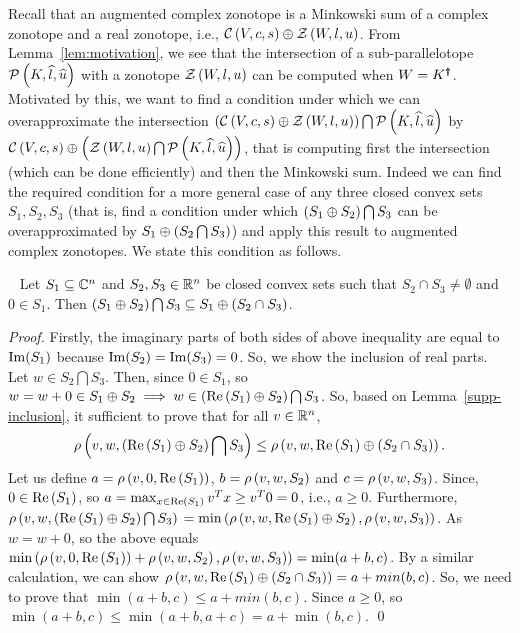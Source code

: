 Recall that an augmented complex zonotope is a Minkowski sum of a
complex zonotope and a real zonotope, i.e.,
$\cz{V}{c}{s}\oplus\zon{W}{l}{u}$.  From Lemma~\ref{lem:motivation},
we see that the intersection of a sub-parallelotope
$\sptope{K}{\wh{l}}{\wh{u}}$ with a zonotope $\zon{W}{l}{u}$ can be
computed when $W=\pinv{K}$.  Motivated by this, we want to
find a condition under which we can overapproximate the intersection
$\lt(\cz{V}{c}{s}\oplus\zon{W}{l}{u}\rt)\bigcap\sptope{K}{\wh{l}}{\wh{u}}$
by
$\cz{V}{c}{s}\oplus\lt(\zon{W}{l}{u}\bigcap\sptope{K}{\wh{l}}{\wh{u}}\rt)$,
that is computing first the intersection (which can be done
efficiently) and then the Minkowski sum.  Indeed we can find the
required condition for a more general case of any three closed convex
sets $S_1,S_2,S_3$ (that is, find a condition under which
$\lt(S_1\oplus S_2\rt)\bigcap S_3$ can be overapproximated by
$S_1\oplus\lt(S_2\bigcap S_3\rt)$) and apply this result to augmented
complex zonotopes. We state this condition as follows.
%
\begin{lemma}~\label{gen-int}
Let $S_1\subseteq \complexset^n$ and $S_2,S_3\in\realset^n$ be closed
convex sets such that $S_2\cap S_3\neq \emptyset$ and $0\in S_1$.
Then $\lt(S_1\oplus S_2\rt)\bigcap S_3\subseteq S_1\oplus\lt(S_2\cap
S_3\rt)$.
\end{lemma}
\begin{proof}
Firstly, the imaginary parts of both sides of above inequality are
equal to $\img(S_1)$ because $\img(S_2)=\img(S_3)=0$. So, we show the
inclusion of real parts.  Let $w\in S_2\bigcap S_3 $.  Then, since
$0\in S_1$, so $w=w+0\in S_1\oplus S_2\imp w\in
\lt(\real\lt(S_1\rt)\oplus S_2\rt)\bigcap S_3$.  So, based on
Lemma~\ref{supp-inclusion}, it sufficient to prove that for all
$v\in\realset^n$, $$\support{w}{v}{\lt(\real\lt(S_1\rt)\oplus
  S_2\rt)\bigcap S_3}\leq
\support{w}{v}{\real\lt(S_1\rt)\oplus\lt(S_2\cap S_3\rt)}.$$ Let us
define $a = \support{0}{v}{\real\lt(S_1\rt)}$, $b=\support{w}{v}{S_2}$
and $c = \support{w}{v}{S_3}$.  Since, $0\in\real\lt(S_1\rt)$, so
$a=\max_{x\in\real\lt(S_1\rt)}v^Tx\geq v^T0 =0$, i.e., $a\geq 0$.
Furthermore, $\support{w}{v}{\lt(\real\lt(S_1\rt)\oplus S_2\rt)\bigcap
  S_3}$ $= \min\lt(\support{w}{v}{\real\lt(S_1\rt)\oplus
  S_2},\support{w}{v}{S_3}\rt)$.  As $w=w+0$, so the above equals
$\min\lt(\support{0}{v}{\real\lt(S_1\rt)}+\support{w}{v}{S_2},\support{w}{v}{S_3}\rt)
= \min(a+b,c)$.  By a similar calculation, we can show
$\support{w}{v}{\real\lt(S_1\rt)\oplus\lt(S_2\cap S_3\rt)} =
a+min(b,c)$.  So, we need to prove that $\min(a+b,c)\leq a+min(b,c)$.
Since $a\geq 0$, so $\min(a+b,c)\leq \min(a+b,a+c) =
a+\min(b,c)$. \qed
\end{proof}

